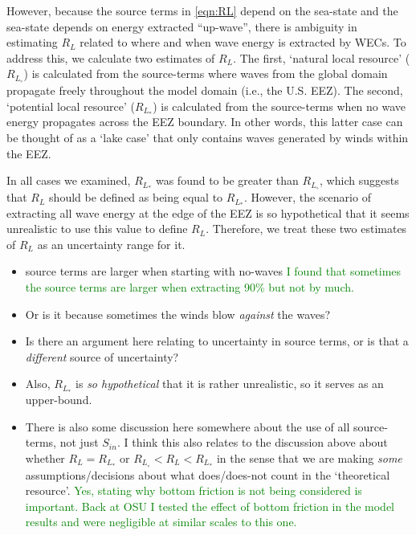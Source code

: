However, because the source terms in \eqref{eqn:RL} depend on the sea-state and the sea-state depends on energy extracted ``up-wave'', there is ambiguity in estimating $R_L$ related to where and when wave energy is extracted by WECs. To address this, we calculate two estimates of $R_L$. The first, `natural local resource' ($R_{L_\circ}$) is calculated from the source-terms where waves from the global domain propagate freely throughout the model domain (i.e., the U.S. EEZ). The second, `potential local resource' ($R_{L_*}$) is calculated from the source-terms when no wave energy propagates across the EEZ boundary. In other words, this latter case can be thought of as a `lake case' that only contains waves generated by winds within the EEZ. 

In all cases we examined, $R_{L_*}$ was found to be greater than $R_{L_\circ}$, which suggests that $R_L$ should be defined as being equal to $R_{L_*}$. However, the scenario of extracting all wave energy at the edge of the EEZ is so hypothetical that it seems unrealistic to use this value to define $R_L$. Therefore, we treat these two estimates of $R_L$ as an uncertainty range for it.

\begin{itemize}
\item source terms are larger when starting with no-waves  \textcolor{green}{I found that sometimes the source terms are larger when extracting 90\% but not by much.}
\item Or is it because sometimes the winds blow {\em against} the waves?
\item Is there an argument here relating to uncertainty in source terms, or is that a {\em different} source of uncertainty?
\item Also, $R_{L_*}$ is {\em so hypothetical} that it is rather unrealistic, so it serves as an upper-bound.
\item There is also some discussion here somewhere about the use of all source-terms, not just $S_{in}$. I think this also relates to the discussion above about whether $R_L = R_{L_*}$ or $R_{L_\circ} < R_L < R_{L_*}$ in the sense that we are making {\em some} assumptions/decisions about what does/does-not count in the `theoretical resource'.  \textcolor{green}{Yes, stating why bottom friction is not being considered is important. Back at OSU I tested the effect of bottom friction in the model results and were negligible at similar scales to this one. \citep{garcia2013inner}}
\end{itemize}

